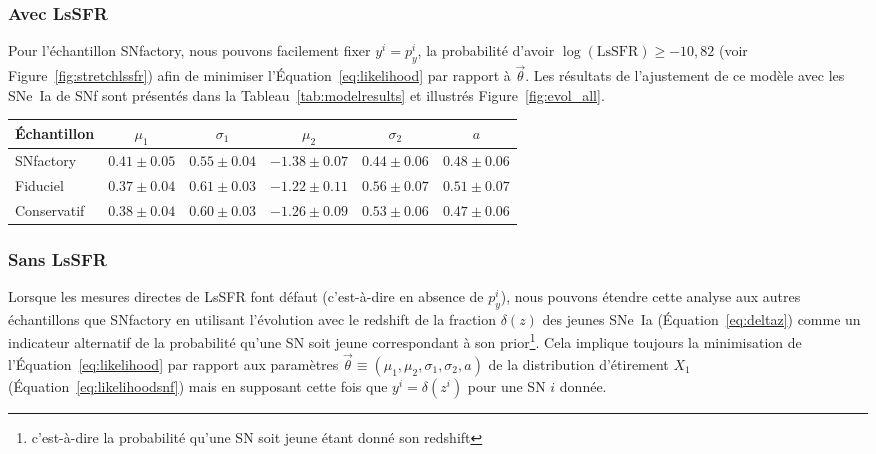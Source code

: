 \documentclass[../main/main.tex]{subfiles}
\begin{document}
\subsubsection*{Avec LsSFR}\label{sssec:lssfr}

Pour l'échantillon SNfactory, nous pouvons facilement fixer $y^i = p_y^i$, la
probabilité d'avoir $\log(\mathrm{LsSFR}) \geq -10,82$ (voir
Figure~\ref{fig:stretchlssfr}) afin de minimiser l'Équation~\ref{eq:likelihood}
par rapport à $\overrightarrow{\theta}$. Les résultats de l'ajustement de ce
modèle avec les SNe~Ia de SNf sont présentés dans la
Tableau~\ref{tab:modelresults} et illustrés Figure~\ref{fig:evol_all}.

\begin{table*}
    \centering
    \caption[Valeurs des paramètres du modèle d'étirement de base selon
    l'échantillon]{Valeurs des paramètres issus des meilleurs ajustements du
        modèle de distribution de l'étirement de base lorsqu'il est
        appliqué à l'ensemble de données de SNfactory seulement (114 SNe~Ia), à
        l'échantillon fiduciel (569 SNe~Ia) ou à l'échantillon conservatif
    (422).}
    \label{tab:modelresults}
    \begin{tabular}{lccccc}
        \toprule
        Échantillon & $\mu_1$             & $\sigma_1$
                    & $\mu_2$             & $\sigma_2$
                    & $a$ \\
        \midrule
        SNfactory   & $ 0.41 \pm 0.05$    & $0.55 \pm 0.04$
                    & $-1.38 \pm 0.07$    & $0.44 \pm 0.06$
                    & $ 0.48 \pm 0.06$ \\
        Fiduciel    & $ 0.37 \pm 0.04$    & $0.61 \pm 0.03$
                    & $-1.22 \pm 0.11$    & $0.56 \pm 0.07$
                    & $ 0.51 \pm 0.07$ \\
        Conservatif & $ 0.38 \pm 0.04$    & $0.60 \pm 0.03$
                    & $-1.26 \pm 0.09$    & $0.53 \pm 0.06$
                    & $ 0.47 \pm 0.06$ \\
        \bottomrule
    \end{tabular}
\end{table*}

\subsubsection*{Sans LsSFR}\label{sssec:z}

Lorsque les mesures directes de LsSFR font défaut (c'est-à-dire en absence de
$p_y^i$), nous pouvons étendre cette analyse aux autres échantillons que
SNfactory en utilisant l'évolution avec le redshift de la fraction $\delta(z)$
des jeunes SNe~Ia (Équation~\ref{eq:deltaz}) comme un indicateur alternatif de
la probabilité qu'une SN soit jeune correspondant à son
prior\footnote{c'est-à-dire la probabilité qu'une SN soit jeune étant donné son
redshift}. Cela implique toujours la minimisation de
l'Équation~\ref{eq:likelihood} par rapport aux paramètres 
$\overrightarrow{\theta}\equiv(\mu_1, \mu_2, \sigma_1, \sigma_2, a)$ de la
distribution d'étirement $X_1$ (Équation~\ref{eq:likelihoodsnf}) mais en
supposant cette fois que $y^i = \delta(z^i)$ pour une SN $i$ donnée.
\end{document}
